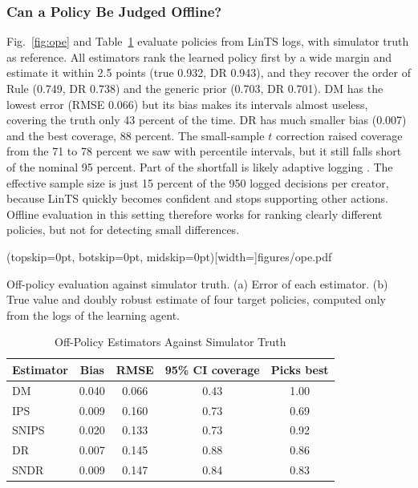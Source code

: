 \documentclass{ieeeaccess}
\begin{document}
\subsubsection{Can a Policy Be Judged Offline?}
Fig.~\ref{fig:ope} and Table~\ref{tab:ope} evaluate policies from LinTS logs, with simulator truth as reference. All estimators rank the learned policy first by a wide margin and estimate it within 2.5 points (true 0.932, DR 0.943), and they recover the order of Rule (0.749, DR 0.738) and the generic prior (0.703, DR 0.701). DM has the lowest error (RMSE 0.066) but its bias makes its intervals almost useless, covering the truth only 43 percent of the time. DR has much smaller bias (0.007) and the best coverage, 88 percent. The small-sample $t$ correction raised coverage from the 71 to 78 percent we saw with percentile intervals, but it still falls short of the nominal 95 percent. Part of the shortfall is likely adaptive logging \cite{hadad2021}. The effective sample size is just 15 percent of the 950 logged decisions per creator, because LinTS quickly becomes confident and stops supporting other actions. Offline evaluation in this setting therefore works for ranking clearly different policies, but not for detecting small differences.

\Figure[t!](topskip=0pt, botskip=0pt, midskip=0pt)[width=\textwidth]{figures/ope.pdf}
{\parbox[t]{0.91\textwidth}{\raggedright Off-policy evaluation against simulator truth. (a) Error of each estimator. (b) True value and doubly robust estimate of four target policies, computed only from the logs of the learning agent.}\label{fig:ope}}

\begin{table}[t]
\caption{Off-Policy Estimators Against Simulator Truth}
\label{tab:ope}
\setlength{\tabcolsep}{4pt}
\centering
\begin{tabular}{|l|c|c|c|c|}
\hline
Estimator & Bias & RMSE & 95\% CI coverage & Picks best \\
\hline
DM & 0.040 & 0.066 & 0.43 & 1.00 \\
IPS & 0.009 & 0.160 & 0.73 & 0.69 \\
SNIPS & 0.020 & 0.133 & 0.73 & 0.92 \\
DR & 0.007 & 0.145 & 0.88 & 0.86 \\
SNDR & 0.009 & 0.147 & 0.84 & 0.83 \\
\hline
\end{tabular}
\end{table}
\end{document}
